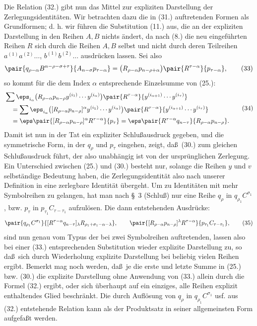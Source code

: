 Die Relation (32.) gibt nun das Mittel zur expliziten Darstellung der Zerlegungsidentit\"aten. Wir betrachten dazu die in (31.) auftretenden Formen als Grundformen; d. h. wir f\"uhren die Substitution (11.) aus, die an der expliziten Darstellung in den Reihen $A,B$ nichts \"andert, da nach (8.) die neu eingef\"uhrten Reihen $R$ sich durch die Reihen $A,B$ selbst und nicht durch deren Teilreihen $a^{(1)}a^{(2)}\ldots$, $b^{(1)}b^{(2)}\ldots$ ausdr\"ucken lassen. Sei also
\begin{equation}
 \pair{q_{\rho-\alpha}B^{n-\rho-\sigma+\tau}}{A_{n-\sigma}p_{\tau-\alpha}}
 =\bigl(R_{\rho-\alpha}p_{n-\rho+\alpha}\bigr)
  \pair{R^{\tau-\alpha}}{p_{\tau-\alpha}},
\tag{33}
\end{equation}
so kommt f\"ur die dem Index $\alpha$ entsprechende Einzelsumme von (25.):
\begin{equation}
\begin{aligned}
&\sum \eps_{i_\alpha}\bigl(R_{\rho-\alpha}p_{n-\rho}y^{(i_1)}\cdots y^{(i_\alpha)}\bigr)
 \pair{R^{\tau-\alpha}}{y^{(i_{\alpha+1})}\cdots y^{(i_\tau)}}\\
&\quad=\sum \eps_{i_\alpha}\bigl([R_{\rho-\alpha}p_{n-\rho}]^\alpha y^{(i_1)}\cdots y^{(i_\alpha)}\bigr)
 \pair{R^{\tau-\alpha}}{y^{(i_{\alpha+1})}\cdots y^{(i_\tau)}}\\
&\quad=\eps\pair{[R_{\rho-\alpha}p_{n-\rho}]^\alpha R^{\tau-\alpha}}{p_\tau}
 =\eps\pair{R^{\tau-\alpha}q_{n-\tau}}{R_{\rho-\alpha}p_{n-\rho}}.
\end{aligned}
\tag{34}
\end{equation}
Damit ist nun in der Tat ein expliziter Schlu\ss ausdruck gegeben, und die symmetrische Form, in der $q_\rho$ und $p_\tau$ eingehen, zeigt, da\ss\ (30.) zum gleichen Schlu\ss ausdruck f\"uhrt, der also unabh\"angig ist von der urspr\"unglichen Zerlegung. Ein Unterschied zwischen (25.) und (30.) besteht nur, solange die Reihen $y$ und $v$ selbst\"andige Bedeutung haben, die Zerlegungsidentit\"at also nach unserer Definition in eine zerlegbare Identit\"at \"ubergeht. Um zu Identit\"aten mit mehr Symbolreihen zu gelangen, hat man nach \S\ 3 (Schlu\ss) nur eine Reihe $q_\rho$ in $q_{\rho_1}C^{\sigma_1}$, bzw. $p_\tau$ in $p_{\tau_1}C_{\tau-\tau_1}$ aufzul\"osen. Die dann entstehenden Ausdr\"ucke:
\begin{equation}
 \pair{q_{\rho_1}C^{\sigma_1}}{[R^{\tau-\alpha}q_{n-\tau}]_\lambda R_{\rho_1+\sigma_1-\alpha-\lambda}},
 \qquad
 \pair{[R_{\rho-\alpha}p_{n-\rho}]^\lambda R^{\tau-\alpha}}{p_{\tau_1}C_{\tau-\tau_1}},
\tag{35}
\end{equation}
sind nun genau vom Typus der bei zwei Symbolreihen auftretenden, lassen also bei einer (33.) entsprechenden Substitution wieder explizite Darstellung zu, so da\ss\ sich durch Wiederholung explizite Darstellung bei beliebig vielen Reihen ergibt. Bemerkt mag noch werden, da\ss\ je die erste und letzte Summe in (25.) bzw. (30.) die explizite Darstellung ohne Anwendung von (33.) allein durch die Formel (32.) ergibt, oder sich \"uberhaupt auf ein einziges, alle Reihen explizit enthaltendes Glied beschr\"ankt. Die durch Aufl\"osung von $q_\rho$ in $q_{\rho_1}C^{\sigma_1}$ usf. aus (32.) entstehende Relation kann als der Produktsatz in seiner allgemeinsten Form aufgefa\ss t werden.

